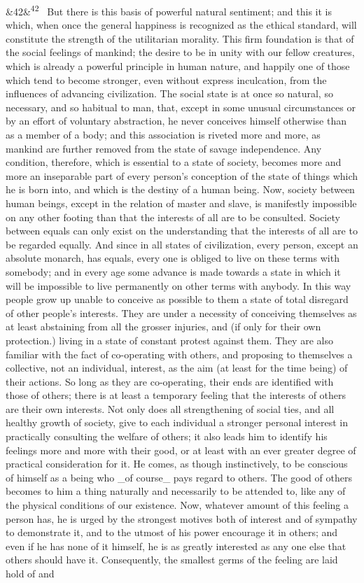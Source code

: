 \documentclass[12pt]{article}
\newcommand{\para}[1][]{\par\noindent\ifx&#1&\else\textsuperscript{\footnotesize #1}~\fi}
\begin{document}
\para[42] But there is this basis of powerful natural sentiment; and this it is which, when once the general happiness is recognized as the ethical standard, will constitute the strength of the utilitarian morality. This firm foundation is that of the social feelings of mankind; the desire to be in unity with our fellow creatures, which is already a powerful principle in human nature, and happily one of those which tend to become stronger, even without express inculcation, from the influences of advancing civilization. The social state is at once so natural, so necessary, and so habitual to man, that, except in some unusual circumstances or by an effort of voluntary abstraction, he never conceives himself otherwise than as a member of a body; and this association is riveted more and more, as mankind are further removed from the state of savage independence. Any condition, therefore, which is essential to a state of society, becomes more and more an inseparable part of every person's conception of the state of things which he is born into, and which is the destiny of a human being. Now, society between human beings, except in the relation of master and slave, is manifestly impossible on any other footing than that the interests of all are to be consulted. Society between equals can only exist on the understanding that the interests of all are to be regarded equally. And since in all states of civilization, every person, except an absolute monarch, has equals, every one is obliged to live on these terms with somebody; and in every age some advance is made towards a state in which it will be impossible to live permanently on other terms with anybody. In this way people grow up unable to conceive as possible to them a state of total disregard of other people's interests. They are under a necessity of conceiving themselves as at least abstaining from all the grosser injuries, and (if only for their own protection.) living in a state of constant protest against them. They are also familiar with the fact of co-operating with others, and proposing to themselves a collective, not an individual, interest, as the aim (at least for the time being) of their actions. So long as they are co-operating, their ends are identified with those of others; there is at least a temporary feeling that the interests of others are their own interests. Not only does all strengthening of social ties, and all healthy growth of society, give to each individual a stronger personal interest in practically consulting the welfare of others; it also leads him to identify his feelings more and more with their good, or at least with an ever greater degree of practical consideration for it. He comes, as though instinctively, to be conscious of himself as a being who \_of course\_ pays regard to others. The good of others becomes to him a thing naturally and necessarily to be attended to, like any of the physical conditions of our existence. Now, whatever amount of this feeling a person has, he is urged by the strongest motives both of interest and of sympathy to demonstrate it, and to the utmost of his power encourage it in others; and even if he has none of it himself, he is as greatly interested as any one else that others should have it. Consequently, the smallest germs of the feeling are laid hold of and 
\end{document}
